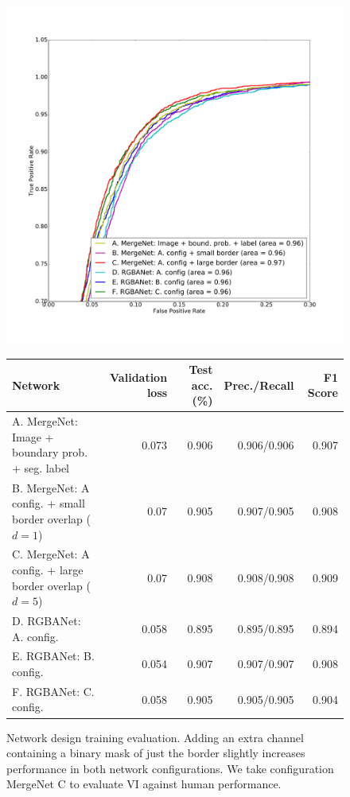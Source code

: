 \begin{figure}[ht]

\includegraphics[width=.5\textwidth]{gfx/roc_plot.pdf}


\begin{tabular}{l rrrr}
\toprule
Network & Validation loss & Test acc. ~(\%) & Prec./Recall & \hspace{0.1cm} F1 Score \\
\midrule
A. MergeNet: Image + boundary prob. + seg. label & 0.073 & 0.906 & 0.906/0.906 & 0.907 \\
B. MergeNet: A config. + small border overlap ($d=1$) & 0.07 & 0.905 & 0.907/0.905 & 0.908 \\
C. MergeNet: A config. + large border overlap ($d=5$) & 0.07 & 0.908 & 0.908/0.908 & 0.909 \\
D. RGBANet: A. config. & 0.058 & 0.895 & 0.895/0.895 & 0.894 \\
E. RGBANet: B. config. & 0.054 & 0.907 & 0.907/0.907 & 0.908 \\
F. RGBANet: C. config. & 0.058 & 0.905 & 0.905/0.905 & 0.904\\
\bottomrule
\end{tabular}

 \caption{Network design training evaluation. Adding an extra channel containing a binary mask of just the border slightly increases performance in both network configurations. We take configuration MergeNet C to evaluate VI against human performance.}
 \label{fig:trainingperformance}
\end{figure}


